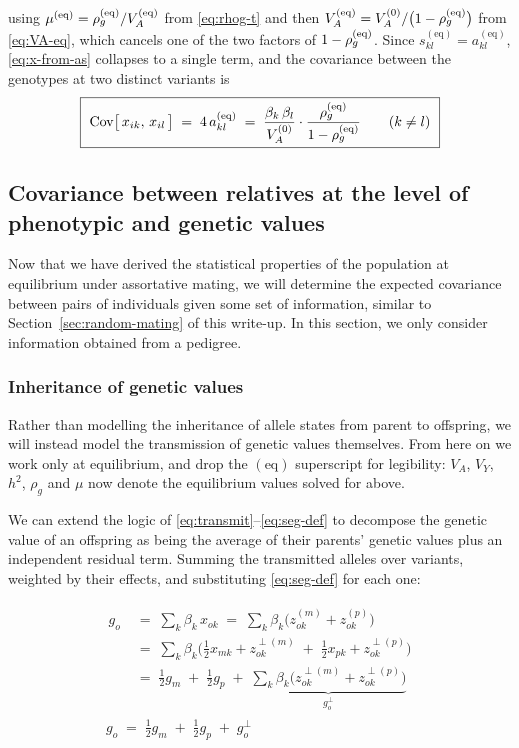 \documentclass[12pt]{article}
\begin{document}
using $\mu^{(\mathrm{eq})} = \rho_g^{(\mathrm{eq})}/V_A^{(\mathrm{eq})}$ from \eqref{eq:rhog-t} and then $V_A^{(\mathrm{eq})} = V_A^{(0)}/\big(1-\rho_g^{(\mathrm{eq})}\big)$ from \eqref{eq:VA-eq}, which cancels one of the two factors of $1-\rho_g^{(\mathrm{eq})}$.
Since $s^{(\mathrm{eq})}_{kl} = a^{(\mathrm{eq})}_{kl}$, \eqref{eq:x-from-as} collapses to a single term, and the covariance between the genotypes at two distinct variants is
\begin{equation}\label{eq:covx-eq}
    \boxed{\ \mathrm{Cov}\big[\,x_{ik},\, x_{il}\,\big] \;=\; 4\,a^{(\mathrm{eq})}_{kl} \;=\; \frac{\beta_k\,\beta_l}{V_A^{(0)}} \cdot \frac{\rho_g^{(\mathrm{eq})}}{1-\rho_g^{(\mathrm{eq})}} \qquad (k \neq l) \ }
\end{equation}

\subsection{Covariance between relatives at the level of phenotypic and genetic values}\label{sec:am-rel-values}
Now that we have derived the statistical properties of the population at equilibrium under assortative mating, we will determine the expected covariance between pairs of individuals given some set of information, similar to Section~\ref{sec:random-mating} of this write-up.
In this section, we only consider information obtained from a pedigree.

\subsubsection{Inheritance of genetic values}
Rather than modelling the inheritance of allele states from parent to offspring, we will instead model the transmission of genetic values themselves.
From here on we work only at equilibrium, and drop the $(\mathrm{eq})$ superscript for legibility: $V_A$, $V_Y$, $h^2$, $\rho_g$ and $\mu$ now denote the equilibrium values solved for above.

We can extend the logic of \eqref{eq:transmit}--\eqref{eq:seg-def} to decompose the genetic value of an offspring as being the average of their parents' genetic values plus an independent residual term.
Summing the transmitted alleles over variants, weighted by their effects, and substituting \eqref{eq:seg-def} for each one:

\begin{equation}\label{eq:g-transmit}
\begin{gathered}
\begin{aligned}
    g_o \;&=\; \sum_k \beta_k\, x_{ok} \;=\; \sum_k \beta_k\big(z^{(m)}_{ok} + z^{(p)}_{ok}\big) \\[4pt]
    \;&=\; \sum_k \beta_k\Big(\tfrac12 x_{mk} + z^{\perp(m)}_{ok} \;+\; \tfrac12 x_{pk} + z^{\perp(p)}_{ok}\Big) \\[4pt]
    \;&=\; \tfrac12 g_m \;+\; \tfrac12 g_p
    \;+\; \underbrace{\sum_k \beta_k\big(z^{\perp(m)}_{ok} + z^{\perp(p)}_{ok}\big)}_{\textstyle g^{\perp}_o}
\end{aligned} \\[8pt]
    \boxed{\ g_o \;=\; \tfrac12 g_m \;+\; \tfrac12 g_p \;+\; g^{\perp}_o \ }
\end{gathered}
\end{equation}
\end{document}
